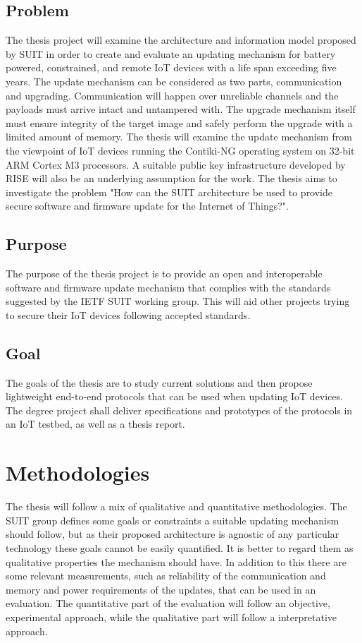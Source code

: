 \documentclass[0-thesis.tex]{subfiles}
\begin{document}
\subsection{Problem}
The thesis project will examine the architecture and information model proposed by SUIT in order to create and evaluate an 
updating mechanism for battery powered, constrained, and remote IoT devices with a life span 
exceeding five years. The update mechanism can be considered as two parts, communication and upgrading.
Communication will happen over unreliable channels and the payloads must arrive intact and untampered 
with. The upgrade mechanism itself must ensure integrity of the target image and safely perform the 
upgrade with a limited amount of memory. The thesis will examine the update mechanism from the viewpoint 
of IoT devices running the Contiki-NG operating system on 32-bit ARM Cortex M3 processors. A suitable 
public key infrastructure developed by RISE will also be an underlying assumption for the work. The thesis 
aims to investigate the problem "How can the SUIT architecture be used to provide secure software and firmware 
update for the Internet of Things?".

\subsection{Purpose}
The purpose of the thesis project is to provide an open and interoperable software and firmware update 
mechanism that complies with the standards suggested by the IETF SUIT working group. This will aid other 
projects trying to secure their IoT devices following accepted standards.

\subsection{Goal}
The goals of the thesis are to study current solutions and then propose lightweight end-to-end protocols 
that can be used when updating IoT devices. The degree project shall deliver specifications and prototypes
of the protocols in an IoT testbed, as well as a thesis report.

\section{Methodologies}
The thesis will follow a mix of qualitative and quantitative methodologies. The SUIT group defines some 
goals or constraints a suitable updating mechanism should follow, but as their proposed architecture is 
agnostic of any particular technology these goals cannot be easily quantified. It is better to regard them 
as qualitative properties the mechanism should have. In addition to this there are some relevant measurements,
such as reliability of the communication and memory and power requirements of the updates, that can be used 
in an evaluation. The quantitative part of the evaluation will follow an objective, experimental approach, while 
the qualitative part will follow a interpretative approach.
\end{document}
